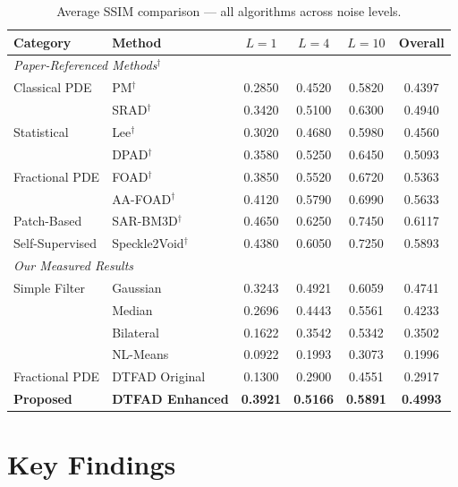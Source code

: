 \documentclass[12pt,a4paper]{article}
\newcommand{\best}[1]{\textcolor{bestgreen}{\textbf{#1}}}
\begin{document}
\begin{table}[H]
\centering
\caption{Average SSIM comparison — all algorithms across noise levels.}
\label{tab:comprehensive_ssim}
\begin{tabular}{llccc|c}
\toprule
\textbf{Category} & \textbf{Method} & \textbf{$L=1$} & \textbf{$L=4$} & \textbf{$L=10$} & \textbf{Overall} \\
\midrule
\multicolumn{6}{l}{\textit{Paper-Referenced Methods}$^{\dagger}$} \\
Classical PDE & PM$^\dagger$ & 0.2850 & 0.4520 & 0.5820 & 0.4397 \\
 & SRAD$^\dagger$ & 0.3420 & 0.5100 & 0.6300 & 0.4940 \\
Statistical & Lee$^\dagger$ & 0.3020 & 0.4680 & 0.5980 & 0.4560 \\
 & DPAD$^\dagger$ & 0.3580 & 0.5250 & 0.6450 & 0.5093 \\
Fractional PDE & FOAD$^\dagger$ & 0.3850 & 0.5520 & 0.6720 & 0.5363 \\
 & AA-FOAD$^\dagger$ & 0.4120 & 0.5790 & 0.6990 & 0.5633 \\
Patch-Based & SAR-BM3D$^\dagger$ & 0.4650 & 0.6250 & 0.7450 & 0.6117 \\
Self-Supervised & Speckle2Void$^\dagger$ & 0.4380 & 0.6050 & 0.7250 & 0.5893 \\
\midrule
\multicolumn{6}{l}{\textit{Our Measured Results}} \\
Simple Filter & Gaussian & 0.3243 & 0.4921 & 0.6059 & 0.4741 \\
 & Median & 0.2696 & 0.4443 & 0.5561 & 0.4233 \\
 & Bilateral & 0.1622 & 0.3542 & 0.5342 & 0.3502 \\
 & NL-Means & 0.0922 & 0.1993 & 0.3073 & 0.1996 \\
Fractional PDE & DTFAD Original & 0.1300 & 0.2900 & 0.4551 & 0.2917 \\
\rowcolor{lightblue!30}
\textbf{Proposed} & \textbf{DTFAD Enhanced} & \best{0.3921} & \best{0.5166} & \best{0.5891} & \textbf{0.4993} \\
\bottomrule
\end{tabular}
\end{table}

\section{Key Findings}
\end{document}
